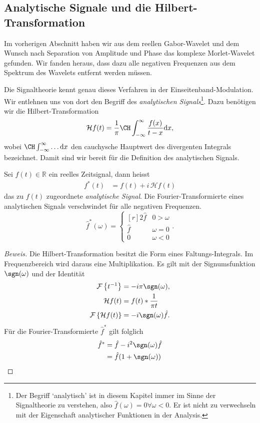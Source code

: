 \subsection{Analytische Signale und die Hilbert-Transformation}
Im vorherigen Abschnitt haben wir aus dem reellen Gabor-Wavelet und dem Wunsch nach Separation von Amplitude und Phase das komplexe Morlet-Wavelet gefunden.
Wir fanden heraus, dass dazu alle negativen Frequenzen aus dem Spektrum des Wavelets entfernt werden müssen.

Die Signaltheorie kennt genau dieses Verfahren in der Einseitenband-Modulation.
Wir entlehnen uns von dort den Begriff des \emph{analytischen Signals}\footnote{
Der Begriff `analytisch' ist in diesem Kapitel immer im Sinne der Signaltheorie zu verstehen, also $\hat f (\omega) = 0 \forall \omega < 0$.
Er ist nicht zu verwechseln mit der Eigenschaft analytischer Funktionen in der Analysis.
}.
Dazu benötigen wir die Hilbert-Transformation
\[
\mathcal{H}f(t) =
\frac{1}{\pi} \CH\int_{-\infty}^{\infty}\frac{f(x)}{t-x} \mathrm{d}x,
\]
wobei $\CH\int_{-\infty}^{\infty} \dots \mathrm{d}x$ den cauchysche Hauptwert des divergenten Integrals bezeichnet.
Damit sind wir bereit für die Definition des analytischen Signals.
\pagebreak
\begin{satz}
	\label{complex:analytic-signal}
	Sei $f(t) \in \mathbb{R}$ ein reelles Zeitsignal, dann heisst
	\begin{align*}
		f^\ast(t) 
		&= f(t) + i\,\mathcal{H}f(t)
	\end{align*}
	das zu $f(t)$ zugeordnete \emph{analytische Signal}.
	Die Fourier-Transformierte eines analytischen Signals verschwindet für alle negativen Frequenzen.
	\[
		\hat{f}^\ast(\omega) = \left\lbrace\begin{matrix*}[r]	
			2\hat{f} & 0 > \omega \\ \hat{f} & \omega= 0 \\ 0 & \omega < 0\end{matrix*} \right..
	\]
\end{satz}

\begin{proof}[Beweis]
	
	Die Hilbert-Transformation besitzt die Form eines Faltungs-Integrals.
	Im Frequenzbereich wird daraus eine Multiplikation.
	Es gilt mit der Signumsfunktion $\sgn(\omega)$ und der Identität
	\begin{align*}
		\mathcal{F} \left\lbrace t^{-1}\right\rbrace  &= -i\pi\sgn(\omega), \\
		\mathcal{H} f(t) &= f(t) * \frac{1}{\pi t} \\
		\mathcal{F}\left\lbrace \mathcal{H}f(t)\right\rbrace &= -i\sgn(\omega) \hat{f}.
	\end{align*}
	Für die Fourier-Transformierte $\hat f^\ast$ gilt folglich 
	\begin{align*}
		\hat{f}^\ast 
		&= \hat{f} - i^2\sgn(\omega)\hat{f}\\
		&= \hat{f}(1 +\sgn(\omega))\qedhere
	\end{align*}
\end{proof}